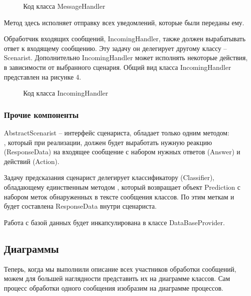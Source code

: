     \begin{figure}[H]
        \centering
        
        \caption{Код класса MessageHandler}
        \label{fig:message_handler}
    \end{figure}

    Метод  здесь исполняет отправку всех уведомлений,
    которые были переданы ему.

    Обработчик входящих сообщений, IncomingHandler, также должен вырабатывать 
    ответ к входящему сообщению. Эту задачу он делегирует другому 
    классу -- Scenarist. Дополнительно IncomingHandler может исполнять некоторые
    действия, в зависимости от выбранного сценария.
    Общий вид класса IncomingHandler представлен на рисунке 4.

    \begin{figure}[H]
        \centering
        
        \caption{Код класса IncomingHandler}
        \label{fig:incoming_handler}
    \end{figure}

    \subsubsection*{Прочие компоненты}
    AbstractScenarist -- интерфейс сценариста, обладает только одним методом:\\
    , который при реализации, должен
    будет выработать нужную реакцию (ResponseData) на входящее сообщение с
    набором нужных ответов (Answer) и действий (Action).

    Задачу предсказания сценарист делегирует классификатору (Classifier),
    обладающему единственным методом , который
    возвращает объект Prediction с набором меток обнаруженных в тексте сообщения
    классов. По этим меткам и будет составлена ResponseData внутри сценариста.

    Работа с базой данных будет инкапсулирована в классе DataBaseProvider.

    \subsection{Диаграммы}
    Теперь, когда мы выполнили описание всех участников обработки сообщений,
    можем для большей наглядности представить их на диаграмме классов.
    Сам процесс обработки одного сообщения изобразим на диаграмме процессов.

